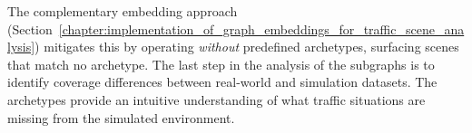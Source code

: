 The complementary embedding approach (Section~\ref{chapter:implementation_of_graph_embeddings_for_traffic_scene_analysis}) mitigates this by operating \emph{without} predefined archetypes, surfacing scenes that match no archetype. The last step in the analysis of the subgraphs is to identify coverage differences between real-world and simulation datasets. The archetypes provide an intuitive understanding of what traffic situations are missing from the simulated environment.

